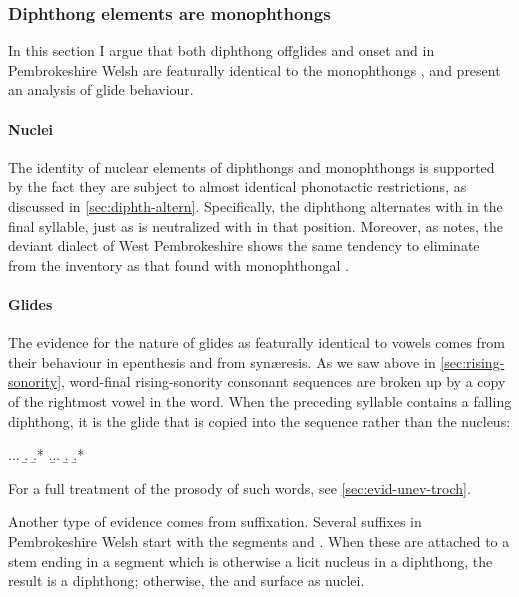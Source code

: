 \subsubsection{Diphthong elements are monophthongs}
\label{sec:diphth-elem-are}

In this section I argue that both diphthong offglides and onset \ipa{[w]} and \ipa{[j]} in Pembrokeshire Welsh are featurally identical to the monophthongs \ipa{[i~u]}, and present an analysis of glide behaviour.

\paragraph{Nuclei}
\label{sec:nuclei}

The identity of nuclear elements of diphthongs and monophthongs is supported by the fact they are subject to almost identical phonotactic restrictions, as discussed in \cref{sec:diphth-altern}. Specifically, the diphthong  alternates with  in the final syllable, just as  is neutralized with \ipa{[i]} in that position. Moreover, as \citet{awbery86:_pembr_welsh} notes, the deviant dialect of West Pembrokeshire shows the same tendency to eliminate \ipa{[əu]} from the inventory as that found with monophthongal \ipa{[ə]}.

\paragraph{Glides}
\label{sec:glides}

The evidence for the nature of glides as featurally identical to vowels comes from their behaviour in epenthesis and from synæresis. As we saw above in \cref{sec:rising-sonority}, word-final rising-sonority consonant sequences are broken up by a copy of the rightmost vowel in the word. When the preceding syllable contains a falling diphthong, it is the glide that is copied into the sequence rather than the nucleus:

\ex.\a.\a.
\b.
\b.*\mbi{[ˈsoudol]}
\z.\b.\a.
\b.
\b.*\mbi{[ˈveider]}

For a full treatment of the prosody of such words, see \cref{sec:evid-unev-troch}.

Another type of evidence comes from suffixation. Several suffixes in Pembrokeshire Welsh start with the segments \ipa{[i]} and \ipa{[u]}. When these are attached to a stem ending in a segment which is otherwise a licit nucleus in a diphthong, the result is a diphthong; otherwise, the \ipa{[i]} and \ipa{[u]} surface as nuclei.

